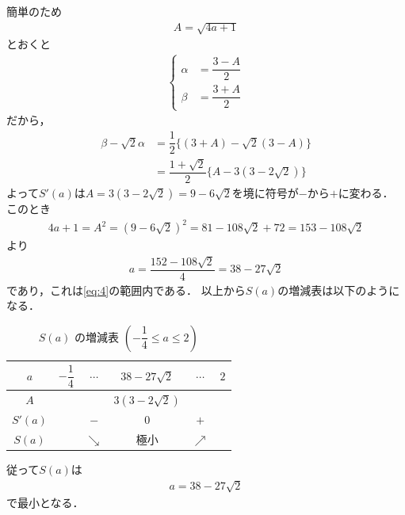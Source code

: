 \documentclass[../../main.tex]{subfiles}
\begin{document}
簡単のため
\begin{align}
  A=\sqrt{4a+1} \label{eq:11}
\end{align}
とおくと
\begin{align}
  \begin{cases}
    \alpha&=\dfrac{3-A}{2} \\
    \beta&=\dfrac{3+A}{2}
  \end{cases}
\end{align}
だから，
\begin{align}
  \beta-\sqrt{2}\alpha
  &=\dfrac{1}{2}\bigl\{(3+A)-\sqrt{2}(3-A)\bigr\} \\
  &=\dfrac{1+\sqrt{2}}{2}\bigl\{A-3(3-2\sqrt{2})\bigr\}
\end{align}
よって$S'(a)$は$A=3(3-2\sqrt{2})=9-6\sqrt{2}$を境に符号が$-$から$+$に変わる．
このとき
\begin{align}
  4a+1=A^2=(9-6\sqrt{2})^2=81-108\sqrt{2}+72=153-108\sqrt{2}
\end{align}
より
\begin{align}
  a=\dfrac{152-108\sqrt{2}}{4}=38-27\sqrt{2}
\end{align}
であり，これは\cref{eq:4}の範囲内である．
以上から$S(a)$の増減表は以下のようになる．

\begin{table}[htb]
  \centering
  \caption{$S(a)$ の増減表 $\left(-\dfrac{1}{4} \le a \le 2\right)$}
  \begin{tabular}{c|ccccc}
    $a$ & $-\dfrac{1}{4}$ & $\cdots$ & $38-27\sqrt{2}$ & $\cdots$ & $2$ \\
    \hline
    $A$ & &  & $3(3-2\sqrt{2})$ &  & \\
    \hline
    $S'(a)$ & & $-$ & $0$ & $+$ & \\
    \hline
    $S(a)$ & & $\searrow$ & 極小 & $\nearrow$ &
  \end{tabular}
\end{table}

従って$S(a)$は
\begin{align}
  a=38-27\sqrt{2}
\end{align}
で最小となる．

\newpage
\end{document}
